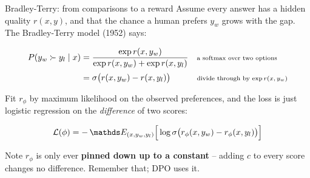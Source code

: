 \documentclass[aspectratio=169]{beamer}
\begin{document}
\begin{frame}{Bradley-Terry: from comparisons to a reward}
  \small
  Assume every answer has a hidden quality $r(x,y)$, and that the chance a human prefers $y_w$
  grows with the gap. The Bradley-Terry model (1952) says:

  \vskip 3pt
  \begin{tcolorbox}[colback=lightbg, colframe=popblue, boxrule=0.7pt, arc=2pt]
    \footnotesize
    \begin{align*}
      P(y_w \succ y_l \mid x) &= \frac{\exp r(x,y_w)}{\exp r(x,y_w) + \exp r(x,y_l)}
        && \text{\scriptsize a softmax over two options} \\[2pt]
      &= \sigma\big( r(x,y_w) - r(x,y_l) \big)
        && \text{\scriptsize divide through by $\exp r(x,y_w)$}
    \end{align*}
  \end{tcolorbox}

  \vskip 4pt
  Fit $r_\phi$ by maximum likelihood on the observed preferences, and the loss is just logistic
  regression on the \emph{difference} of two scores:

  \vskip 2pt
  \begin{center}
  \begin{tcolorbox}[colback=paramgreen!8, colframe=paramgreen, boxrule=0.7pt, arc=2pt, width=0.78\textwidth]
    \[ \mathcal{L}(\phi) = -\,\E_{(x,y_w,y_l)}\Big[ \log \sigma\big( r_\phi(x,y_w) - r_\phi(x,y_l) \big) \Big] \]
  \end{tcolorbox}
  \end{center}

  \vskip 4pt
  \begin{center}
    \footnotesize
    Note $r_\phi$ is only ever \textbf{pinned down up to a constant} -- adding $c$ to every score
    changes no difference. Remember that; DPO uses it.
  \end{center}
\end{frame}
\end{document}
